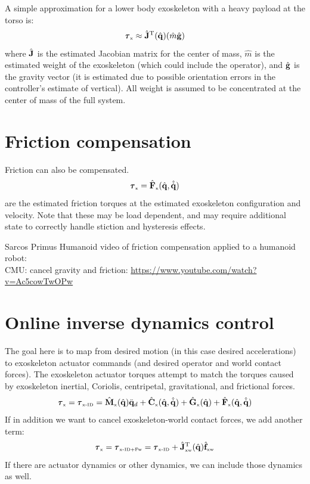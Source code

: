 \documentclass[letterpaper,12pt,fullpage]{article}
\newcommand{\myx}{{\mbox {\tiny x}}}
\newcommand{\xw}{{\mbox {\tiny xw}}}
\newcommand{\xinvdyn}{{\mbox {\tiny x-ID}}}
\newcommand{\xinvdynw}{{\mbox {\tiny x-ID+Fw}}}
\begin{document}
A simple approximation for a lower body exoskeleton with a heavy payload at the
torso is:
\begin{equation}
\vtau_{\myx} \approx \hat{\mJ}^{\tr}(\hat{\vq}) (\hat{m} \hat{\vg})
\end{equation}
where $\hat{{\bf J}}$ is the estimated Jacobian matrix for the center of mass,
$\hat{m}$ is the estimated
weight of the exoskeleton (which could include the operator),
and $\hat{{\bf g}}$ is the gravity vector (it is estimated due to possible orientation
errors in the controller's estimate of vertical).
All weight is assumed to be concentrated at the center of mass of the full system.

\section{Friction compensation}

Friction can also be compensated.
\begin{equation}
\vtau_{\myx} = \hat{\mF}_{\myx}(\hat{\vq},\hat{\dot{\vq}}) 
\end{equation}
are the estimated friction torques at the estimated exoskeleton configuration
and velocity.
Note that these may be load dependent, and may require additional state to
correctly handle stiction and hysteresis effects.

Sarcos Primus Humanoid video of friction compensation applied
to a humanoid robot:\\
CMU: cancel gravity and friction: \url{https://www.youtube.com/watch?v=Ac5cowTwOPw}\\

\section{Online inverse dynamics control}
\label{sec:invdyn}

The goal here is to map from desired motion (in this case desired
accelerations) to exoskeleton actuator commands (and desired operator
and world contact forces).
The exoskeleton actuator torques
attempt to match the torques caused by exoskeleton inertial, Coriolis, centripetal,
gravitational, and frictional forces.
\begin{equation}
\vtau_{\myx} = \vtau_{\xinvdyn} 
= \hat{\mM}_{\myx}(\hat{\vq}) \ddot{\vq}_d
+ \hat{\mC}_{\myx}(\hat{\vq},\hat{\dot{\vq}})
+ \hat{\mG}_{\myx}(\hat{\vq})
+ \hat{\mF}_{\myx}(\hat{\vq},\hat{\dot{\vq}})
\end{equation}
If in addition we want to cancel exoskeleton-world contact forces,
we add another term:
\begin{equation}
\vtau_{\myx} = \vtau_{\xinvdynw} = \vtau_{\xinvdyn} 
+ \hat{\mJ}_{\xw}^{\tr}(\hat{\vq}) \hat{\vf}_{\xw}
\end{equation}
If there are actuator dynamics or other dynamics, we can include those
dynamics as well.
\end{document}
